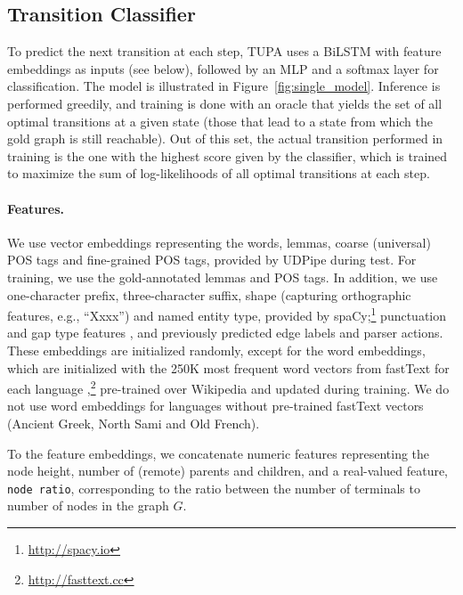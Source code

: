 \documentclass[11pt,a4paper]{article}
\begin{document}
\subsection{Transition Classifier}\label{sec:classifier}

To predict the next transition at each step,
TUPA uses a BiLSTM with feature embeddings as inputs (see below),
followed by an MLP and a softmax layer for classification.
The model is illustrated in Figure~\ref{fig:single_model}.
Inference is performed greedily,
and training is done with an oracle that yields the set of all optimal 
transitions at a given state (those that lead to a state from which the gold graph is still reachable).
Out of this set, the actual transition performed in training is the one
with the highest score given by the classifier,
which is trained to maximize the sum of log-likelihoods of all 
optimal transitions at each step.




\paragraph{Features.}

We use vector embeddings
representing the words, lemmas, coarse (universal) POS tags and fine-grained POS tags,
provided by UDPipe during test.
For training, we use the gold-annotated lemmas and POS tags.
In addition, we use one-character prefix, three-character suffix,
shape (capturing orthographic features, e.g., ``Xxxx'') and named entity type,
provided by spaCy;\footnote{\url{http://spacy.io}}
punctuation and gap type features \cite{maier-lichte:2016:DiscoNLP},
and previously predicted edge labels and parser actions.
These embeddings are initialized randomly, except for the word embeddings,
which are initialized with the 250K most frequent word vectors from fastText
for each language
\cite{bojanowski2016enriching},\footnote{\url{http://fasttext.cc}}
pre-trained over Wikipedia and updated during training.
We do not use word embeddings for languages without pre-trained fastText vectors
(Ancient Greek, North Sami and Old French).

To the feature embeddings, we concatenate
numeric features representing the node height, number of (remote) parents and children,
and a real-valued feature,
\texttt{node ratio}, corresponding to the ratio between the number of terminals to number of nodes
in the graph $G$.
\end{document}
